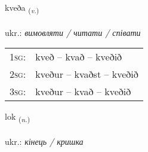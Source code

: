 \documentclass[frontgrid, backgrid]{flacards}\usepackage[]{graphicx}\usepackage[]{xcolor}
\begin{document}
\renewcommand{\flhead}{\vskip5pt \fboxsep=0pt {\small\bfseries\footnotesize Sagnorð | дієслово}}
\renewcommand{\fcfoot}{\vskip5pt \fboxsep=0pt \hspace{2pt}{\small\bfseries\footnotesize 1K}}

\renewcommand{\blhead}{\vskip5pt {\small\bfseries\footnotesize Sagnorð | дієслово }}
\renewcommand{\bcfoot}{\vskip5pt \hspace{2pt}{\small\bfseries\footnotesize 1K}}


{kveða \small{\textsubscript{(\textit{v.})}} \\[1ex] %
\textphonetic{[kʰvɛːða]} \\
ukr.: \emph{вимовляти / читати / співати} \\  [2ex]
\renewcommand*{\arraystretch}{0.8}
\begin{tabular}{p{1cm}l}
\textsc{1sg}: & kveð -- kvað -- kveðið \\ 
\textsc{2sg}: & kveður -- kvaðst -- kveðið \\ 
\textsc{3sg}: & kveður -- kvað -- kveðið \\ 
\end{tabular}
}

\renewcommand{\flhead}{\vskip5pt \fboxsep=0pt {\small\bfseries\footnotesize Nafnorð | іменник}}
\renewcommand{\fcfoot}{\vskip5pt \fboxsep=0pt \hspace{2pt}{\small\bfseries\footnotesize 1K}}

\renewcommand{\blhead}{\vskip5pt {\small\bfseries\footnotesize Nafnorð | іменник }}
\renewcommand{\bcfoot}{\vskip5pt \hspace{2pt}{\small\bfseries\footnotesize 1K}}


{lok \small{\textsubscript{(\textit{n.})}} \\[1ex] %
\textphonetic{[lɔːk]} \\
ukr.: \emph{кінець / кришка} \\  [2ex]
\renewcommand*{\arraystretch}{0.8}
}
\end{document}
